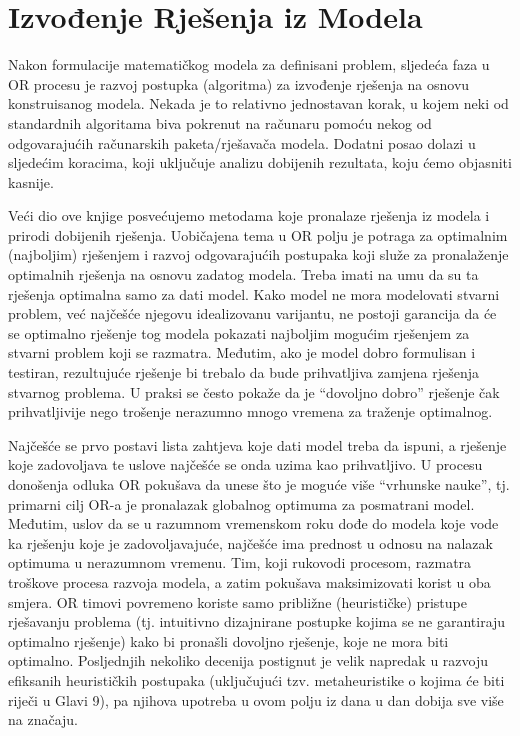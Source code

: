 \documentclass[a4paper, utf8, 11pt, colorlinks]{book}
\begin{document}
\section{Izvođenje Rješenja iz Modela}

Nakon formulacije matematičkog modela za definisani problem, sljedeća faza u OR procesu je razvoj postupka (algoritma) za
izvođenje rješenja na osnovu konstruisanog modela. Nekada je to relativno jednostavan korak, u kojem neki od standardnih algoritama biva pokrenut na računaru pomoću nekog od   odgovarajućih računarskih paketa/rješavača modela.
Dodatni posao dolazi u sljedećim koracima, koji uključuje 
analizu dobijenih rezultata, koju ćemo objasniti kasnije. 

Veći dio ove knjige posvećujemo metodama koje pronalaze rješenja iz modela i prirodi dobijenih  rješenja.  Uobičajena tema u OR polju je potraga za optimalnim (najboljim) rješenjem i razvoj odgovarajućih postupaka koji služe za pronala\-ženje optimalnih rješenja na osnovu zadatog modela. Treba imati na umu da su ta rješenja optimalna samo za dati model. Kako model ne mora modelovati stvarni problem, već najčešće njegovu idealizovanu varijantu, ne postoji garancija da će se optimalno rješenje tog modela pokazati najboljim mogućim rješenjem za stvarni problem koji se razmatra. Međutim, ako je
model dobro formulisan i testiran, rezultujuće rješenje  bi trebalo da bude prihvatljiva zamjena rješenja stvarnog problema. U praksi se često pokaže da je ``dovoljno dobro'' rješenje čak prihvatljivije nego trošenje nerazumno mnogo vremena za traženje optimalnog.

Najčešće se prvo postavi lista zahtjeva koje dati model treba da ispuni, a rješenje koje zadovoljava te uslove najčešće se onda uzima kao prihvatljivo. U procesu donošenja odluka OR pokušava da unese što je moguće više ``vrhunske nauke'', tj. primarni cilj OR-a je pronalazak globalnog optimuma za posmatrani model. Međutim,  uslov da se u razumnom vremenskom roku dođe do modela koje vode ka rješenju koje je zadovoljavajuće, najčešće ima prednost u odnosu na nalazak optimuma u nerazumnom vremenu. Tim, koji rukovodi procesom, razmatra troškove procesa razvoja modela, a zatim
pokušava maksimizovati korist u oba smjera. OR timovi povremeno koriste samo približne (heurističke) pristupe rješavanju problema (tj. intuitivno dizajnirane postupke kojima se ne garantiraju optimalno rješenje) kako bi pronašli dovoljno  rješenje, koje ne mora biti optimalno. Posljednjih nekoliko decenija postignut je velik napredak u razvoju efiksanih heurističkih postupaka (uključujući tzv. metaheuristike o kojima će biti riječi u Glavi 9), pa njihova upotreba u ovom polju iz dana u dan  dobija sve više na značaju.  
\end{document}
